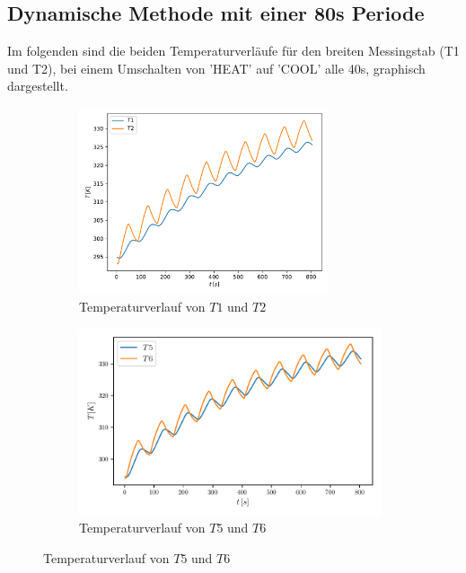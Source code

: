     \subsection{Dynamische Methode mit einer 80s Periode}

    Im folgenden sind die beiden Temperaturverläufe für den breiten Messingstab (T1 und T2), bei einem Umschalten von 'HEAT' auf 'COOL' alle 40s, graphisch dargestellt.
    \begin{figure}
        \begin{subfigure}{0.48\textwidth}
               \centering
               \includegraphics[height=5.5cm]{Daten/grafic3.pdf}
               \caption{Temperaturverlauf von $T1$ und $T2$}
               \label{fig:dyn_T1}
        \end{subfigure}
    \hfill
        \begin{subfigure}{0.48\textwidth}
               \centering
               \includegraphics[height=5.5cm]{Daten/grafic5.pdf}
               \caption{Temperaturverlauf von $T5$ und $T6$}
               \label{fig:dyn_T5}
        \end{subfigure}
    \end{figure}
    
